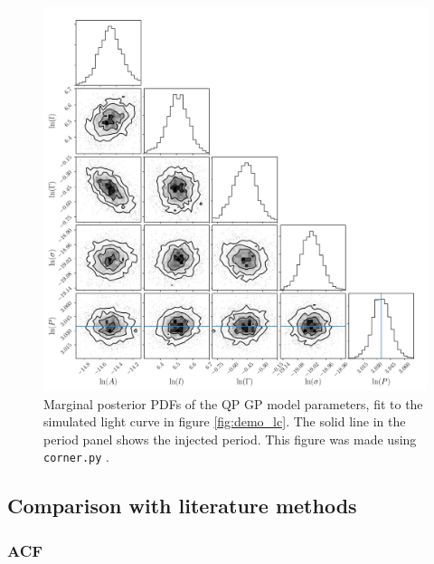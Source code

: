 \documentclass[a4paper,fleqn,usenatbib,useAMS]{mnras}
\newcommand{\Kepler}{{\it Kepler}}
\newcommand{\kepler}{\Kepler}
\begin{document}
\begin{figure}
\begin{center}
\includegraphics[width=6in, clip=true]{figures/corner_plot.pdf}
\caption{Marginal posterior PDFs of the QP GP model parameters, fit to the
    simulated light curve in figure \ref{fig:demo_lc}.
    The solid line in the period panel shows the injected period.
    This figure was made using \texttt{corner.py} \citep{Corner}.}
\label{fig:gp_posteriors}
\end{center}
\end{figure}


\subsection{Comparison with literature methods}
\label{sec:comparison}
\subsubsection{ACF}
\label{sec:acf}

\end{document}
